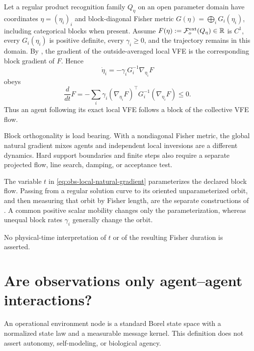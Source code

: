 Let a regular product recognition family $Q_\eta$ on an open parameter domain
have coordinates $\eta=(\eta_i)_i$ and block-diagonal Fisher metric
$G(\eta)=\bigoplus_iG_i(\eta_i)$, including categorical blocks when present.
Assume $F(\eta):=\mathcal F_o^{\rm ext}(Q_\eta)\in\mathbb R$ is $C^1$, every
$G_i(\eta_i)$ is positive definite, every $\gamma_i\geq0$, and the trajectory
remains in this domain.
By , the gradient of the outside-averaged
local VFE is the corresponding block gradient of $F$.  Hence
\begin{equation}
\dot\eta_i=-\gamma_iG_i^{-1}\nabla_{\eta_i}F
\label{eq:obs-local-natural-gradient}
\end{equation}
obeys
\begin{equation}
\frac{d}{dt}F
=-\sum_i\gamma_i
(\nabla_{\eta_i}F)^\top
G_i^{-1}(\nabla_{\eta_i}F)\leq0.
\label{eq:obs-global-dissipation}
\end{equation}
Thus an agent following its exact local VFE follows a block of the collective
VFE flow.  

Block orthogonality is load bearing.  With a nondiagonal Fisher metric, the
global natural gradient mixes agents and independent local inversions are a
different dynamics.  Hard support boundaries and finite steps also require a
separate projected flow, line search, damping, or acceptance test.

The variable \(t\) in \eqref{eq:obs-local-natural-gradient} parameterizes the
declared block flow.  Passing from a regular solution curve to its oriented
unparameterized orbit, and then measuring that orbit by Fisher length, are the
separate constructions of
.  A common
positive scalar mobility changes only the parameterization, whereas unequal
block rates \(\gamma_i\) generally change the orbit.  

No physical-time interpretation of \(t\) or of the resulting Fisher duration
is asserted.  

\section{Are observations only agent--agent interactions?}
\label{sec:local-observation-equivalence}

An operational environment node is a standard Borel state space with a
normalized state law and a measurable message kernel.  This definition does
not assert autonomy, self-modeling, or biological agency.  


